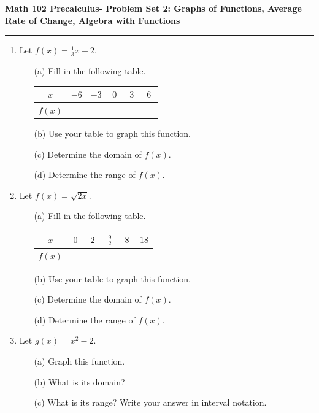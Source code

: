 \documentclass[12pt]{amsart}
\newcommand{\class}{Math 102}
\newcommand{\term}{Precalculus}
\newcommand{\quiztitle}{Problem Set 2: Graphs of Functions, Average Rate of Change, Algebra with Functions}
\begin{document}
\textbf{\class \xspace\xspace \term \xspace\xspace - \quiztitle\\}
\rule[1ex]{\textwidth}{.1pt}




\begin{enumerate}

\item Let $f(x) = \frac{1}{3} x + 2$.
\begin{itemize}
\item[(a)] Fill in the following table.
\begin{tabular}{| c | c | c | c | c | c |}
\hline
$x$ & $-6$ & $-3$ & $0$ & $3$ & $6$ \\
\hline
$f(x)$ & \ \   & \ \  & \ \  & \ \  & \ \ \\
\hline
\end{tabular}
\item[(b)] Use your table to graph this function.
\item[(c)] Determine the domain of $f(x)$.
\item[(d)] Determine the range of $f(x)$. 
\end{itemize}

\item Let $f(x) = \sqrt{ 2 x}$.

\begin{itemize}
\item[(a)] Fill in the following table.
\begin{tabular}{| c | c | c | c | c | c |}
\hline
$x$ & $0$ & $2$ & $\frac{9}{2}$ & $8$ & $18$ \\
\hline
$f(x)$ & \ \   & \ \  & \ \  & \ \  & \ \ \\
\hline
\end{tabular}
\item[(b)] Use your table to graph this function.
\item[(c)] Determine the domain of $f(x)$.
\item[(d)] Determine the range of $f(x)$. 
\end{itemize}

\item Let $g(x) = x^2-2$.
\begin{itemize}
\item[(a)] Graph this function.
\item[(b)] What is its domain?
\item[(c)] What is its range? Write your answer in interval notation.
\end{itemize}


\end{enumerate}
\end{document}
